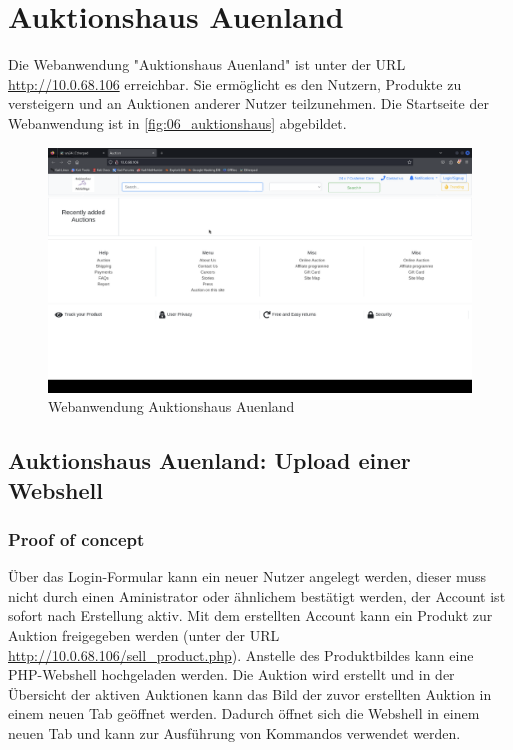 \pagebreak
\chapter{Auktionshaus Auenland}
Die Webanwendung "Auktionshaus Auenland" ist unter der URL \url{http://10.0.68.106} erreichbar. Sie ermöglicht es den Nutzern, Produkte zu versteigern und an Auktionen anderer Nutzer teilzunehmen. Die Startseite der Webanwendung ist in \autoref{fig:06_auktionshaus} abgebildet.\\
\bigskip

\begin{figure}[!ht]
    \centering
    \includegraphics[width=\linewidth]{images/screenshots/08_auktionshaus.png}
    \caption{Webanwendung Auktionshaus Auenland}
    \label{fig:06_auktionshaus}
\end{figure}
\newpage


\section{\makecvssbadge Auktionshaus Auenland: Upload einer Webshell}

\subsection*{Proof of concept}
Über das Login-Formular kann ein neuer Nutzer angelegt werden, dieser muss nicht durch einen Aministrator oder ähnlichem bestätigt werden, der Account ist sofort nach Erstellung aktiv. Mit dem erstellten Account kann ein Produkt zur Auktion freigegeben werden (unter der URL \url{http://10.0.68.106/sell_product.php}). Anstelle des Produktbildes kann eine PHP-Webshell hochgeladen werden. Die Auktion wird erstellt und in der Übersicht der aktiven Auktionen kann das Bild der zuvor erstellten Auktion in einem neuen Tab geöffnet werden. Dadurch öffnet sich die Webshell in einem neuen Tab und kann zur Ausführung von Kommandos verwendet werden.

